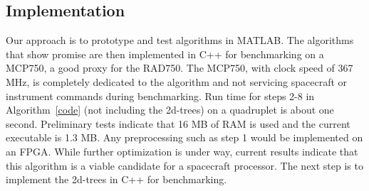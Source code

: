 \subsection{Implementation}
Our approach is to prototype and test algorithms in MATLAB. The algorithms that show promise are then implemented in C++ 
for benchmarking on a MCP750, a good proxy for the RAD750. The MCP750,  with clock speed of 367 MHz, is completely dedicated to the algorithm and not servicing spacecraft or instrument commands during benchmarking.  Run time for steps 2-8 in Algorithm~\ref{code} (not including the 2d-trees) on a quadruplet is about one second. Preliminary tests indicate that 16 MB of RAM is used and the current executable is 1.3 MB. Any preprocessing such as step 1 would be implemented on an FPGA. While further optimization is under way, current results indicate that this algorithm is a viable candidate for a spacecraft processor. The next step is to implement the 2d-trees in C++ for benchmarking.  

